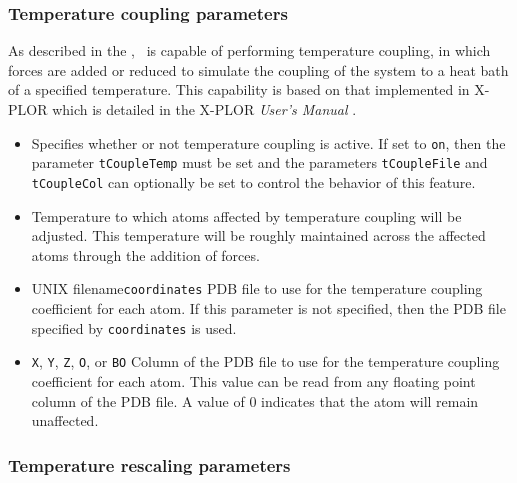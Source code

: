 \subsubsection{Temperature coupling parameters}

As described in the \PG, \NAMD\ is capable
of performing temperature coupling, in which forces are added or 
reduced to simulate the coupling of the system to a heat bath 
of a specified temperature.  
This capability is based on that implemented in X-PLOR which is detailed
in the X-PLOR {\it User's Manual} .

\begin{itemize}

\item
{}
{Specifies whether or not temperature coupling is active.  
If set to {\tt on}, then the parameter {\tt tCoupleTemp} must be set and 
the parameters {\tt tCoupleFile} and {\tt tCoupleCol} can 
optionally be set to control the behavior of this feature.} 

\item
{}
{Temperature to which atoms affected 
by temperature coupling will be adjusted.  
This temperature will be roughly maintained across the affected atoms 
through the addition of forces.}

\item
{}
{UNIX filename}{{\tt coordinates}}
{PDB file to use for the temperature coupling coefficient for each atom.  
If this parameter is not specified, then 
the PDB file specified by {\tt coordinates} is used.} 

\item
{}
{{\tt X}, {\tt Y}, {\tt Z}, {\tt O}, or {\tt B}}{{\tt O}} 
{Column of the PDB file to use for the temperature coupling coefficient for 
each atom.  This value can be read from any 
floating point column of the PDB file.  
A value of $0$ indicates that the atom will remain unaffected.}

\end{itemize}

\subsubsection{Temperature rescaling parameters}

